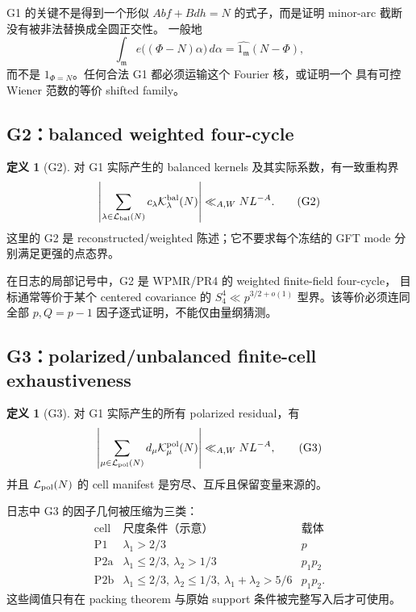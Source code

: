 \documentclass[11pt,a4paper]{ctexart}
\theoremstyle{definition}
\newtheorem{definition}[theorem]{定义}
\newcommand{\LL}{\mathcal L}
\newcommand{\K}{\mathcal K}
\begin{document}
G1 的关键不是得到一个形似
\(Abf+Bdh=N\) 的式子，而是证明 minor-arc 截断没有被非法替换成全圆正交性。
一般地
\[
\int_{\mathfrak m}e\bigl((\Phi-N)\alpha\bigr)\,d\alpha
=\widehat{1_{\mathfrak m}}(N-\Phi),
\]
而不是 $1_{\Phi=N}$。任何合法 G1 都必须运输这个 Fourier 核，或证明一个
具有可控 Wiener 范数的等价 shifted family。

\subsection{G2：balanced weighted four-cycle}

\begin{definition}[G2]
对 G1 实际产生的 balanced kernels 及其实际系数，有一致重构界
\[
\left|\sum_{\lambda\in\LL_{\rm bal}(N)}
c_\lambda\K_\lambda^{\rm bal}(N)\right|
\ll_{A,W}NL^{-A}.                                         \tag{G2}
\]
这里的 G2 是 reconstructed/weighted 陈述；它不要求每个冻结的 GFT mode
分别满足更强的点态界。
\end{definition}

在日志的局部记号中，G2 是 WPMR/PR4 的 weighted finite-field four-cycle，
目标通常等价于某个 centered covariance 的
\(S_4^4\ll p^{3/2+o(1)}\) 型界。该等价必须连同全部 $p,Q=p-1$
因子逐式证明，不能仅由量纲猜测。

\subsection{G3：polarized/unbalanced finite-cell exhaustiveness}

\begin{definition}[G3]
对 G1 实际产生的所有 polarized residual，有
\[
\left|\sum_{\mu\in\LL_{\rm pol}(N)}
d_\mu\K_\mu^{\rm pol}(N)\right|
\ll_{A,W}NL^{-A},                                         \tag{G3}
\]
并且 $\LL_{\rm pol}(N)$ 的 cell manifest 是穷尽、互斥且保留变量来源的。
\end{definition}

日志中 G3 的因子几何被压缩为三类：
\[
\begin{array}{c|c|c}
\text{cell}&\text{尺度条件（示意）}&\text{载体}\\ \hline
\mathrm{P1}&\lambda_1>2/3& p\\
\mathrm{P2a}&\lambda_1\le2/3,\ \lambda_2>1/3&p_1p_2\\
\mathrm{P2b}&\lambda_1\le2/3,\ \lambda_2\le1/3,
\ \lambda_1+\lambda_2>5/6&p_1p_2.
\end{array}
\tag{3.1}
\]
这些阈值只有在 packing theorem 与原始 support 条件被完整写入后才可使用。
\end{document}
